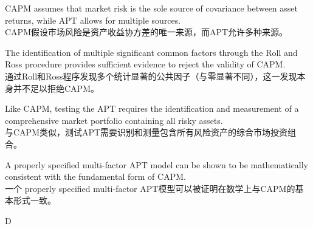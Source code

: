 \documentclass{article}
\begin{document}
\begin{choices}
    \item CAPM assumes that market risk is the sole source of covariance between asset returns, while APT allows for multiple sources.
    \\
    CAPM假设市场风险是资产收益协方差的唯一来源，而APT允许多种来源。
    \item The identification of multiple significant common factors through the Roll and Ross procedure provides sufficient evidence to reject the validity of CAPM.
    \\
    通过Roll和Ross程序发现多个统计显著的公共因子（与零显著不同），这一发现本身并不足以拒绝CAPM。
    \item Like CAPM, testing the APT requires the identification and measurement of a comprehensive market portfolio containing all risky assets.
    \\
    与CAPM类似，测试APT需要识别和测量包含所有风险资产的综合市场投资组合。
    \item A properly specified multi-factor APT model can be shown to be mathematically consistent with the fundamental form of CAPM.
    \\
    一个 properly specified multi-factor APT模型可以被证明在数学上与CAPM的基本形式一致。
\end{choices}

\begin{correctanswer}
    D
\end{correctanswer}
\end{document}
